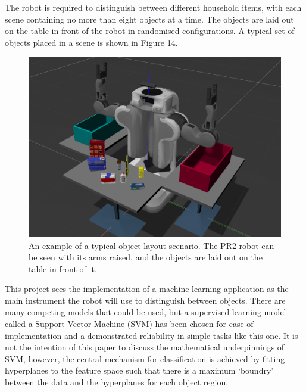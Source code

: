 \documentclass[a4paper]{article}
\begin{document}
The robot is required to distinguish between different household items, with each scene containing no more than eight objects at a time. The objects are laid out on the table in front of the robot in randomised configurations. A typical set of objects placed in a scene is shown in Figure 14.
\begin{figure}[h]
\centering
\includegraphics[scale=0.15]{object_layout}
\caption{An example of a typical object layout scenario. The PR2 robot can be seen with its arms raised, and the objects are laid out on the table in front of it.}
\end{figure}

This project sees the implementation of a machine learning application as the main instrument the robot will use to distinguish between objects. There are many competing models that could be used, but a supervised learning model called a Support Vector Machine (SVM) has been chosen for ease of implementation and a demonstrated reliability in simple tasks like this one. It is not the intention of this paper to discuss the mathematical underpinnings of SVM, however, the central mechanism for classification is achieved by fitting hyperplanes to the feature space such that there is a maximum `boundry' between the data and the hyperplanes for each object region.
\newpage
\end{document}
